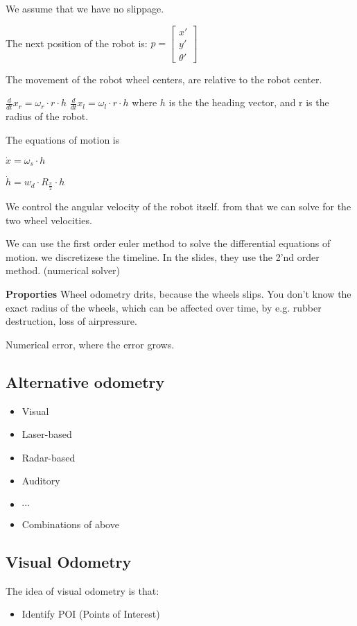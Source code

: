 \documentclass[a4paper]{article}
\begin{document}
We assume that we have no slippage.

The next position of the robot is:
$
p = \begin{bmatrix}
x' \\
y' \\
\theta'
\end{bmatrix}
$

The movement of the robot wheel centers, are relative to the robot center.  

$\frac{d}{dt}x_r = \omega_r \cdot r \cdot h$ 
$\frac{d}{dt}x_l = \omega_l \cdot r \cdot h$ 
where $h$ is the the heading vector, and r is the radius of the robot.

The equations of motion is 



$\dot{x} = \omega_s \cdot h$


$\dot{h} = w_d \cdot R_{\frac{\pi}{2}} \cdot h$

We control the angular velocity of the robot itself.
from that we can solve for the two wheel velocities.


We can use the first order euler method to solve the differential equations of motion.
we discretizese the timeline.
In the slides, they use the 2'nd order method. (numerical solver)

\textbf{Proporties}
Wheel odometry drits, because the wheels slips. You don't know the exact radius of the wheels, which can be affected over time, by e.g. rubber destruction, loss of airpressure. 

Numerical error, where the error grows. 


\subsection{Alternative odometry}
\begin{itemize}
	\item Visual 
	\item Laser-based 
	\item Radar-based
	\item Auditory
	\item $\cdots$
	\item Combinations of above
\end{itemize}

\subsection{Visual Odometry}
The idea of visual odometry is that:
\begin{itemize}
	\item Identify POI (Points of Interest)
\end{itemize}
\end{document}
